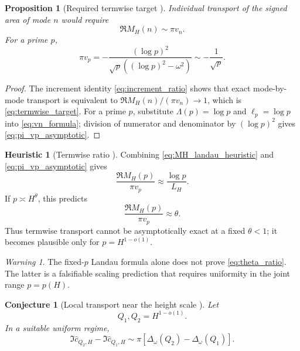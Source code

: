 \documentclass[11pt]{amsart}
\numberwithin{equation}{section}
\theoremstyle{plain}
\newtheorem{proposition}[theorem]{Proposition}
\newtheorem{conjecture}[theorem]{Conjecture}
\theoremstyle{definition}
\newtheorem{heuristic}[theorem]{Heuristic}
\theoremstyle{remark}
\newtheorem{warning}[theorem]{Warning}
\newcommand{\1}{\mathbf{1}}
\begin{document}
\begin{proposition}[Required termwise target {}]
\label{prop:termwise_target}
Individual transport of the signed area of mode \(n\) would require
\begin{equation}
\Re M_H(n)\sim\pi v_n.
\label{eq:termwise_target}
\end{equation}
For a prime \(p\),
\begin{equation}
\pi v_p
=
-\frac{(\log p)^2}
{\sqrt p((\log p)^2-\omega^2)}
\sim
-\frac1{\sqrt p}.
\label{eq:pi_vp_asymptotic}
\end{equation}
\end{proposition}

\begin{proof}
The increment identity \eqref{eq:increment_ratio} shows that exact
mode-by-mode transport is equivalent to
\(\Re M_H(n)/(\pi v_n)\to1\), which is
\eqref{eq:termwise_target}.  For a prime \(p\), substitute
\(\Lambda(p)=\log p\) and \(\ell_p=\log p\) into
\eqref{eq:vn_formula}; division of numerator and denominator by
\((\log p)^2\) gives \eqref{eq:pi_vp_asymptotic}.
\end{proof}

\begin{heuristic}[Termwise ratio {\normalfont[Heuristic]}]
\label{heur:termwise_ratio}
Combining \eqref{eq:MH_landau_heuristic} and
\eqref{eq:pi_vp_asymptotic} gives
\begin{equation}
\frac{\Re M_H(p)}{\pi v_p}
\approx
\frac{\log p}{L_H}.
\label{eq:termwise_ratio}
\end{equation}
If \(p\asymp H^\theta\), this predicts
\begin{equation}
\frac{\Re M_H(p)}{\pi v_p}
\approx\theta.
\label{eq:theta_ratio}
\end{equation}
Thus termwise transport cannot be asymptotically exact at a fixed
\(\theta<1\); it becomes plausible only for
\(p=H^{1-o(1)}\).
\end{heuristic}

\begin{warning}
\label{warn:uniform_landau}
The fixed-\(p\) Landau formula alone does not prove
\eqref{eq:theta_ratio}.  The latter is a falsifiable scaling prediction
that requires uniformity in the joint range \(p=p(H)\).
\end{warning}

\begin{conjecture}[Local transport near the height scale {\normalfont[Conjecture]}]
\label{conj:local_transport}
Let
\begin{equation}
Q_1,Q_2=H^{1-o(1)}.
\label{eq:local_Q_range}
\end{equation}
In a suitable uniform regime,
\begin{equation}
\Im\widehat c_{Q_2,H}-\Im\widehat c_{Q_1,H}
\sim
\pi\left[
\Delta_\omega(Q_2)-\Delta_\omega(Q_1)
\right].
\label{eq:local_transport_conjecture}
\end{equation}
\end{conjecture}
\end{document}
